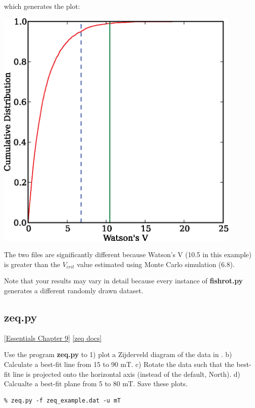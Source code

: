 \documentclass[11pt]{book}
\begin{document}
{\noindent  which generates the plot:


\includegraphics[width=12cm]{EPSfiles/watsonsV_example.eps}

 The two files are significantly different because Watson's V (10.5 in this example) is greater than the $V_{crit}$ value estimated using Monte Carlo simulation (6.8).

 Note that your results may vary in detail because every instance of {\bf fishrot.py}  generates  a different randomly drawn dataset.

%
\subsection{zeq.py}
\href{http://earthref.org/MAGIC/books/Tauxe/Essentials/WebBook3ch9.html#ch9}{[Essentials Chapter 9]}
\href{https://github.com/PmagPy/PmagPy/blob/master/programs/zeq.py}{[zeq docs]}

Use the program {\bf zeq.py} to 1) plot a Zijderveld diagram of the data in .  b) Calculate a best-fit line from 15 to 90 mT.  c) Rotate the data such that the best-fit line is projected onto the horizontal axis (instead of the default, North).   d) Calcualte a best-fit plane from 5 to 80 mT.  Save these plots.


\begin{verbatim}
% zeq.py -f zeq_example.dat -u mT
\end{verbatim}

}
\end{document}
